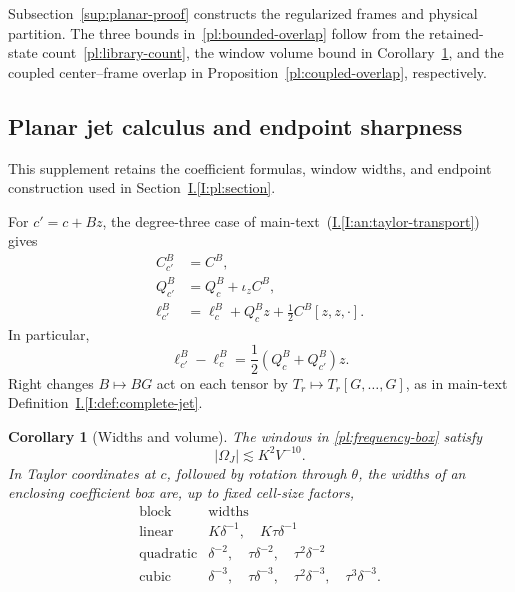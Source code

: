 \documentclass[11pt]{amsart}
\newtheorem{corollary}[theorem]{Corollary}
\theoremstyle{definition}
\theoremstyle{remark}
\numberwithin{equation}{section}
\newcommand{\partIref}[1]{\hyperref[I:#1]{I.\ref*{I:#1}}}
\newcommand{\partIeqref}[1]{\textup{(\partIref{#1})}}
\begin{document}
Subsection~\ref{sup:planar-proof} constructs the regularized frames and physical partition. The three bounds in~\eqref{pl:bounded-overlap} follow from the retained-state count~\eqref{pl:library-count}, the window volume bound in Corollary~\ref{pl:box-volume}, and the coupled center--frame overlap in Proposition~\ref{pl:coupled-overlap}, respectively.

\subsection{Planar jet calculus and endpoint sharpness}\label{sup:planar-calculus}
This supplement retains the coefficient formulas, window widths, and endpoint construction used in Section~\partIref{pl:section}.

For $c'=c+Bz$, the degree-three case of main-text~\partIeqref{an:taylor-transport} gives
\begin{align}
C^B_{c'}&=C^B,\label{pl:C-translation}\\
Q^B_{c'}&=Q_c^B+\iota_zC^B,\label{pl:Q-translation}\\
\ell^B_{c'}&=\ell_c^B+Q_c^Bz+\frac12C^B[z,z,\cdot].\label{pl:L-translation}
\end{align}
In particular,
\begin{equation}\label{pl:L-symmetric}
\ell^B_{c'}-\ell_c^B=\frac12(Q_c^B+Q^B_{c'})z.
\end{equation}
Right changes $B\mapsto BG$ act on each tensor by $T_r\mapsto T_r[G,\ldots,G]$, as in main-text Definition~\partIref{def:complete-jet}.

\begin{corollary}[Widths and volume]\label{pl:box-volume}
The windows in \eqref{pl:frequency-box} satisfy
\begin{equation}\label{pl:frequency-volume}
|\Omega_J|\lesssim K^2V^{-10}.
\end{equation}
In Taylor coordinates at $c$, followed by rotation through $\theta$, the widths of an enclosing coefficient box are, up to fixed cell-size factors,
\begin{equation}\label{pl:raw-widths}
\begin{array}{c|l}
\text{block}&\text{widths}\\ \hline
\text{linear}&K\delta^{-1},\quad K\tau\delta^{-1}\\[1mm]
\text{quadratic}&\delta^{-2},\quad\tau\delta^{-2},\quad\tau^2\delta^{-2}\\[1mm]
\text{cubic}&\delta^{-3},\quad\tau\delta^{-3},\quad\tau^2\delta^{-3},\quad\tau^3\delta^{-3}.
\end{array}
\end{equation}
\end{corollary}
\end{document}

